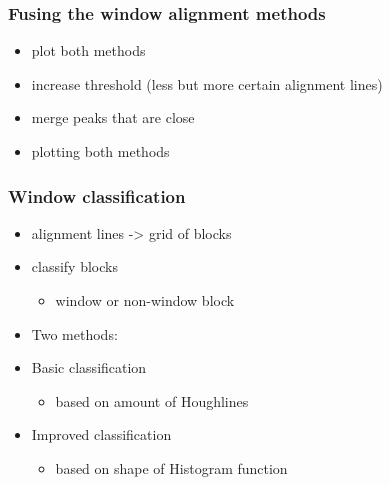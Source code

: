 \documentclass{beamer}
\begin{document}
\frame
{
	\frametitle{Fusing the window alignment methods}
	\begin{itemize}
	\item <+-| alert@+> plot both methods
	\item <+-| alert@+> increase threshold (less but more certain alignment lines)
	\item <+-| alert@+> merge peaks that are close
	\item <+-| alert@+> plotting both methods
	\end{itemize}
}

\frame
{
}


\frame
{
}

\frame
{
}

\frame
{
}

\frame
{
}


\frame
{
	\frametitle{Window classification}
	\begin{itemize}
	\item <+-| alert@+> alignment lines -> grid of blocks
	\item <+-| alert@+> classify blocks 
		\begin{itemize}
		\item <+-| alert@+> window or non-window block
		\end{itemize}
	\item <+-| alert@+> Two methods:
	\item <+-| alert@+> Basic classification 
		\begin{itemize}
		\item <+-| alert@+> based on amount of Houghlines
		\end{itemize}
	\item <+-| alert@+> Improved classification 
		\begin{itemize}
		\item <+-| alert@+> based on shape of Histogram function
		\end{itemize}
	\end{itemize}
}
\end{document}
